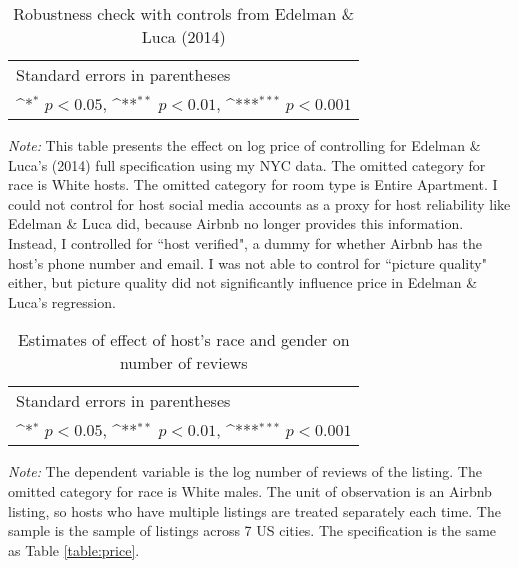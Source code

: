 \begin{table}[htbp]\centering
	\def\sym#1{\ifmmode^{#1}\else\(^{#1}\)\fi}
	
	\caption{Robustness check with controls from Edelman \& Luca (2014)}
	\begin{tabular}{l*{1}{c}}
		\hline\hline
		 
		\hline\hline
		\multicolumn{2}{l}{\footnotesize Standard errors in parentheses}\\
		\multicolumn{2}{l}{\footnotesize \sym{*} \(p<0.05\), \sym{**} \(p<0.01\), \sym{***} \(p<0.001\)}\\
	\end{tabular}
\label{table:edelman_new}
	\begin{tablenotes}
		\item {\it Note:} This table presents the effect on log price of controlling for Edelman \& Luca's (2014) full specification using my NYC data. The omitted category for race is White hosts. The omitted category for room type is Entire Apartment. I could not control for host social media accounts as a proxy for host reliability like Edelman \& Luca did, because Airbnb no longer provides this information. Instead, I controlled for ``host verified", a dummy for whether Airbnb has the host's phone number and email. I was not able to control for ``picture quality" either, but picture quality did not significantly influence price in Edelman \& Luca's regression.
	\end{tablenotes}
\end{table}


\begin{table}[htbp]\centering
	\def\sym#1{\ifmmode^{#1}\else\(^{#1}\)\fi}
	\caption{Estimates of effect of host’s race and gender on number of reviews}
	\begin{tabular}{l*{4}{c}}
		\hline\hline
		
		\hline\hline
		\multicolumn{5}{l}{\footnotesize Standard errors in parentheses}\\
		\multicolumn{5}{l}{\footnotesize \sym{*} \(p<0.05\), \sym{**} \(p<0.01\), \sym{***} \(p<0.001\)}\\
	\end{tabular}
\label{table:num_reviews}

	\begin{tablenotes}
		\item {\it Note:} The dependent variable is the log number of reviews of the listing. The omitted category for race is White males. The unit of observation is an Airbnb listing, so hosts who have multiple listings are treated separately each time. The sample is the sample of listings across 7 US cities. The specification is the same as Table \ref{table:price}.	
	\end{tablenotes}
\end{table}



